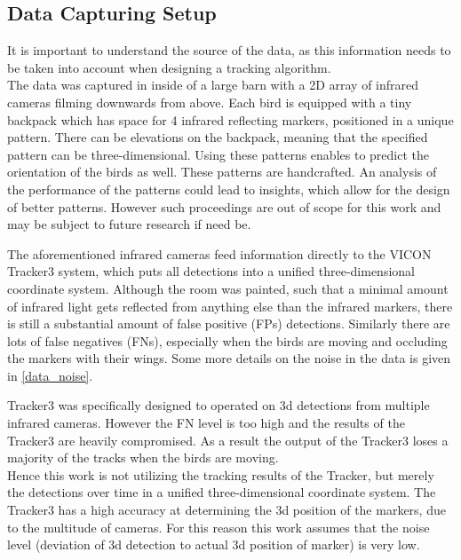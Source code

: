 \documentclass{article}
\begin{document}
\subsection{Data Capturing Setup}
\label{data_setup}



It is important to understand the source of the data, as this information needs to be taken into account when designing a tracking algorithm.\\
The data was captured in inside of a large barn %
with a 2D array of infrared cameras filming downwards from above. Each bird is equipped with a tiny backpack which has space for 4 infrared reflecting markers, positioned in a unique pattern. There can be elevations on the backpack, meaning that the specified pattern can be three-dimensional. Using these patterns enables to predict the orientation of the birds as well. These patterns are handcrafted. An analysis of the performance of the patterns could lead to insights, which allow for the design of better patterns. However such proceedings are out of scope for this work and may be subject to future research if need be.

The aforementioned infrared cameras feed information directly to the VICON Tracker3 system, which puts all detections into a unified three-dimensional coordinate system.  Although the room was painted, such that a minimal amount of infrared light gets reflected from anything else than the infrared markers, there is still a substantial amount of false positive (FPs) detections. Similarly there are lots of false negatives (FNs), especially when the birds are moving and occluding the markers with their wings. Some more details on the noise in the data is given in \ref{data_noise}.

 Tracker3 was specifically designed to operated on 3d detections from multiple infrared cameras. However the FN level is too high and the results of the Tracker3 are heavily compromised. As a result the output of the Tracker3 loses a majority of the tracks when the birds are moving.\\
 Hence this work is not utilizing the tracking results of the Tracker, but merely the detections over time in a unified three-dimensional coordinate system. The Tracker3 has a high accuracy at determining the 3d position of the markers, due to the multitude of cameras. For this reason this work assumes that the noise level (deviation of 3d detection to actual 3d position of marker) is very low.
\end{document}
